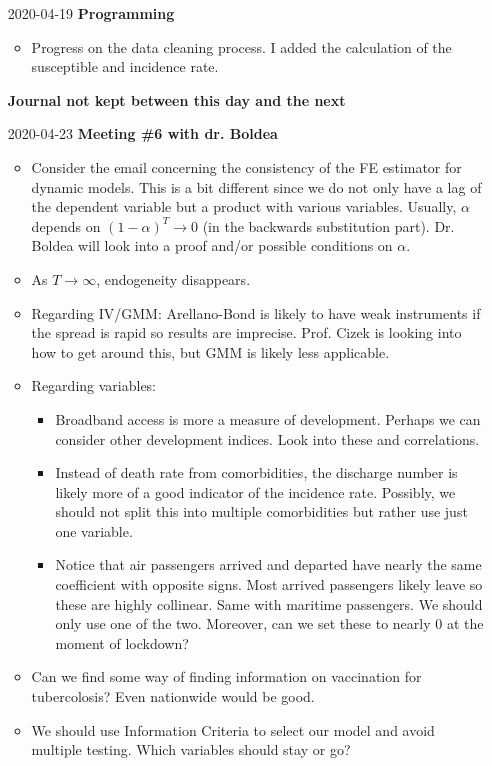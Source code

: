 \documentclass{article}
\begin{document}
\begin{itemize}
	\item[2020-04-19]
	\textbf{Programming}
	\begin{itemize}
		\item Progress on the data cleaning process. I added the calculation of the susceptible and incidence rate.
	\end{itemize}
	
	\textbf{Journal not kept between this day and the next}
	
	\item[2020-04-23]
	\textbf{Meeting \#6 with dr. Boldea}
	\begin{itemize}
		\item Consider the email concerning the consistency of the FE estimator for dynamic models. This is a bit different since we do not only have a lag of the dependent variable but a product with various variables. Usually, $\alpha$ depends on $(1-\alpha)^T \to 0$ (in the backwards substitution part). Dr. Boldea will look into a proof and/or possible conditions on $\alpha$.
		\item As $T \to \infty$, endogeneity disappears.
		\item Regarding IV/GMM: Arellano-Bond is likely to have weak instruments if the spread is rapid so results are imprecise. Prof. Cizek is looking into how to get around this, but GMM is likely less applicable.
		\item Regarding variables:
		\begin{itemize}
			\item Broadband access is more a measure of development. Perhaps we can consider other development indices. Look into these and correlations.
			\item Instead of death rate from comorbidities, the discharge number is likely more of a good indicator of the incidence rate. Possibly, we should not split this into multiple comorbidities but rather use just one variable.
			\item Notice that air passengers arrived and departed have nearly the same coefficient with opposite signs. Most arrived passengers likely leave so these are highly collinear. Same with maritime passengers. We should only use one of the two. Moreover, can we set these to nearly 0 at the moment of lockdown?
		\end{itemize}
		\item Can we find some way of finding information on vaccination for tubercolosis? Even nationwide would be good.
		\item We should use Information Criteria to select our model and avoid multiple testing. Which variables should stay or go?

\end{itemize}
\end{itemize}
\end{document}
